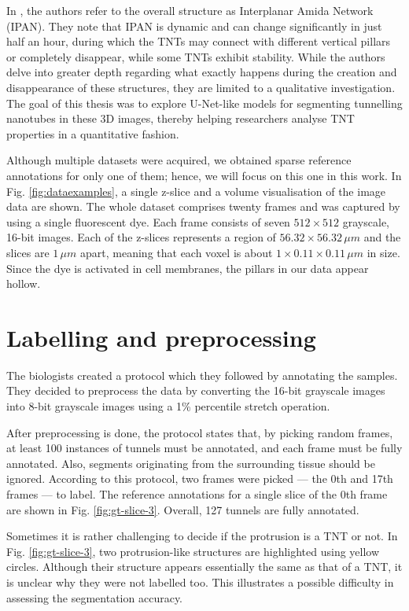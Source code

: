 \documentclass[
  digital,     %
  oneside,     %
  nosansbold,  %
  nocolorbold, %
  lof,         %
  lot,         %
]{fithesis4}
\begin{document}
In \parencite{Tran2024Programmed}, the authors refer to the overall structure as Interplanar Amida Network (IPAN). They note that IPAN is dynamic and can change significantly in just half an hour, during which the TNTs may connect with different vertical pillars or completely disappear, while some TNTs exhibit stability. While the authors delve into greater depth regarding what exactly happens during the creation and disappearance of these structures, they are limited to a qualitative investigation. The goal of this thesis was to explore U-Net-like models for segmenting tunnelling nanotubes in these 3D images, thereby helping researchers analyse TNT properties in a quantitative fashion. 

Although multiple datasets were acquired, we obtained sparse reference annotations for only one of them; hence, we will focus on this one in this work. In Fig. \ref{fig:dataexamples}, a single z-slice and a volume visualisation of the image data are shown. The whole dataset comprises twenty frames and was captured by using a single fluorescent dye. Each frame consists of seven $512 \times 512$ grayscale, 16-bit images. Each of the z-slices represents a region of $56.32 \times 56.32 \, \mu m$ and the slices are $1 \, \mu m$ apart, meaning that each voxel is about $1 \times 0.11 \times 0.11 \, \mu m$ in size. Since the dye is activated in cell membranes, the pillars in our data appear hollow. 

\section*{Labelling and preprocessing}

The biologists created a protocol which they followed by annotating the samples. They decided to preprocess the data by converting the 16-bit grayscale images into 8-bit grayscale images using a 1\% percentile stretch operation.

After preprocessing is done, the protocol states that, by picking random frames, at least 100 instances of tunnels must be annotated, and each frame must be fully annotated. Also, segments originating from the surrounding tissue should be ignored. According to this protocol, two frames were picked — the 0th and 17th frames — to label. The reference annotations for a single slice of the 0th frame are shown in Fig. \ref{fig:gt-slice-3}. Overall, 127 tunnels are fully annotated.

Sometimes it is rather challenging to decide if the protrusion is a TNT or not. In Fig. \ref{fig:gt-slice-3}, two protrusion-like structures are highlighted using yellow circles. Although their structure appears essentially the same as that of a TNT, it is unclear why they were not labelled too. This illustrates a possible difficulty in assessing the segmentation accuracy.
\end{document}
